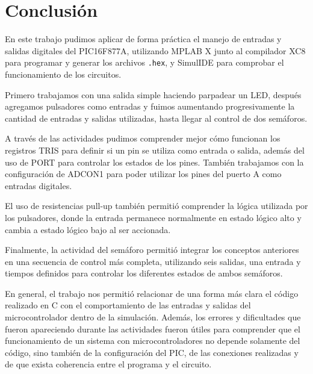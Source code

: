 \documentclass[12pt,a4paper]{article}
\begin{document}

\section{Conclusión}

En este trabajo pudimos aplicar de forma práctica el manejo de entradas y salidas digitales del PIC16F877A, utilizando MPLAB X junto al compilador XC8 para programar y generar los archivos \texttt{.hex}, y SimulIDE para comprobar el funcionamiento de los circuitos.

Primero trabajamos con una salida simple haciendo parpadear un LED, después agregamos pulsadores como entradas y fuimos aumentando progresivamente la cantidad de entradas y salidas utilizadas, hasta llegar al control de dos semáforos.

A través de las actividades pudimos comprender mejor cómo funcionan los registros TRIS para definir si un pin se utiliza como entrada o salida, además del uso de PORT para controlar los estados de los pines. También trabajamos con la configuración de ADCON1 para poder utilizar los pines del puerto A como entradas digitales.

El uso de resistencias pull-up también permitió comprender la lógica utilizada por los pulsadores, donde la entrada permanece normalmente en estado lógico alto y cambia a estado lógico bajo al ser accionada.

Finalmente, la actividad del semáforo permitió integrar los conceptos anteriores en una secuencia de control más completa, utilizando seis salidas, una entrada y tiempos definidos para controlar los diferentes estados de ambos semáforos.

En general, el trabajo nos permitió relacionar de una forma más clara el código realizado en C con el comportamiento de las entradas y salidas del microcontrolador dentro de la simulación. Además, los errores y dificultades que fueron apareciendo durante las actividades fueron útiles para comprender que el funcionamiento de un sistema con microcontroladores no depende solamente del código, sino también de la configuración del PIC, de las conexiones realizadas y de que exista coherencia entre el programa y el circuito.
\end{document}
